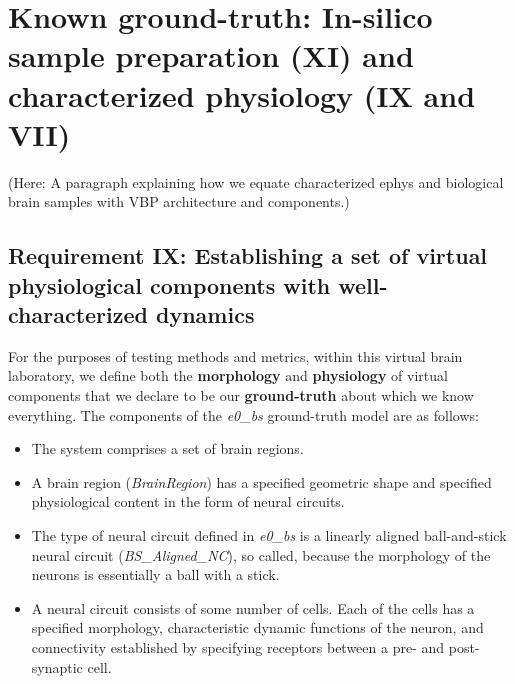 \documentclass{ldr-article}
\def\firstexp{\textit{e0\_bs} }
\begin{document}



\section{Known ground-truth: In-silico sample preparation (XI) and characterized physiology (IX and VII)}

(Here: A paragraph explaining how we equate characterized ephys and biological brain samples with VBP architecture and components.)


\subsection{Requirement IX: Establishing a set of virtual physiological components with well-characterized dynamics}

For the purposes of testing methods and metrics, within this virtual brain laboratory, we define both the \textbf{morphology} and \textbf{physiology} of virtual components that we declare to be our \textbf{ground-truth} about which we know everything. The components of the \firstexp ground-truth model are as follows:

\begin{itemize}
	\item The system comprises a set of brain regions.
	\item A brain region (\textit{BrainRegion}) has a specified geometric shape and specified physiological content in the form of neural circuits.
	\item The type of neural circuit defined in \firstexp is a linearly aligned ball-and-stick neural circuit (\textit{BS\_Aligned\_NC}), so called, because the morphology of the neurons is essentially a ball with a stick.
	\item A neural circuit consists of some number of cells. Each of the cells has a specified morphology, characteristic dynamic functions of the neuron, and connectivity established by specifying receptors between a pre- and post-synaptic cell.
\end{itemize}
\end{document}
